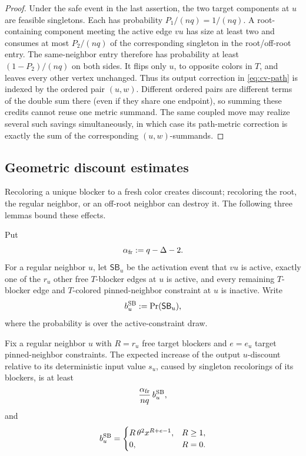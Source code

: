 \begin{proof}
Under the safe event in the last assertion, the two target components at
$u$ are feasible singletons. Each has probability $P_1/(nq)=1/(nq)$. A
root-containing component meeting the active edge $vu$ has size at least two and consumes
at most $P_2/(nq)$ of the corresponding singleton in the root/off-root
entry. The same-neighbor entry therefore has probability at least $(1-P_2)/(nq)$ on both
sides. It flips only $u$, to opposite colors in $T$, and leaves every
other vertex unchanged. Thus its output correction in
\eqref{eq:cv-path} is indexed by the ordered pair $(u,w)$. Different
ordered pairs are different terms of the double sum there (even if they
share one endpoint), so summing these credits cannot reuse one metric
summand. The same coupled move may realize several such savings
simultaneously, in which case its path-metric correction is exactly the sum
of the corresponding $(u,w)$-summands.
\end{proof}

\subsection{Geometric discount estimates}

Recoloring a unique blocker to a fresh color creates discount; recoloring
the root, the regular neighbor, or an off-root neighbor can destroy it.  The following
three lemmas bound these effects.

Put
\begin{equation}\label{eq:cv-alpha}
  \alpha_{\mathrm{fr}}:=q-\Delta-2 .
\end{equation}
For a regular neighbor \(u\), let \(\mathsf{SB}_u\) be the activation
event that \(vu\) is active, exactly one of the \(r_u\) other free
\(T\)-blocker edges at \(u\) is active, and every remaining \(T\)-blocker
edge and \(T\)-colored pinned-neighbor constraint at \(u\) is inactive.
Write
\[
  b_u^{\rm SB}:=\Pr(\mathsf{SB}_u),
\]
where the probability is over the active-constraint draw.

\begin{lemma}\label{lem:cv-fresh}
Fix a regular neighbor $u$ with $R=r_u$ free target blockers and \(e=e_u\) target
pinned-neighbor constraints. The expected increase of the output $u$-discount relative
to its deterministic input value $s_u$, caused by singleton recolorings of
its blockers, is at least
\[
  \frac{\alpha_{\mathrm{fr}}}{nq}\,
  b_u^{\rm SB},
\]
and
\[
  b_u^{\rm SB}=
  \begin{cases}
    R\,\theta^2x^{R+e-1},&R\ge1,\\
    0,&R=0.
  \end{cases}
\]
\end{lemma}


